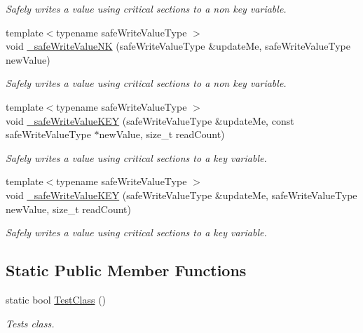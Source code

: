 \begin{DoxyCompactItemize}
\begin{DoxyCompactList}\small\item\em Safely writes a value using critical sections to a non key variable. \item\end{DoxyCompactList}\item 
{\footnotesize template$<$typename safeWriteValueType $>$ }\\void \hyperlink{class_concurrency_control_simple_af44214e11945a1e5cc44d5773c2d080a}{\_\-safeWriteValueNK} (safeWriteValueType \&updateMe, safeWriteValueType newValue)
\begin{DoxyCompactList}\small\item\em Safely writes a value using critical sections to a non key variable. \item\end{DoxyCompactList}\item 
{\footnotesize template$<$typename safeWriteValueType $>$ }\\void \hyperlink{class_concurrency_control_simple_a6b6ed3c59460ce6458c49b66412a6cbe}{\_\-safeWriteValueKEY} (safeWriteValueType \&updateMe, const safeWriteValueType $\ast$newValue, size\_\-t readCount)
\begin{DoxyCompactList}\small\item\em Safely writes a value using critical sections to a key variable. \item\end{DoxyCompactList}\item 
{\footnotesize template$<$typename safeWriteValueType $>$ }\\void \hyperlink{class_concurrency_control_simple_abd290165d11b7841ef88863b8d7b4fe1}{\_\-safeWriteValueKEY} (safeWriteValueType \&updateMe, safeWriteValueType newValue, size\_\-t readCount)
\begin{DoxyCompactList}\small\item\em Safely writes a value using critical sections to a key variable. \item\end{DoxyCompactList}\end{DoxyCompactItemize}
\subsection*{Static Public Member Functions}
\begin{DoxyCompactItemize}
\item 
static bool \hyperlink{class_concurrency_control_simple_a10aee9429b3c42640e3bb44d932a74c4}{TestClass} ()
\begin{DoxyCompactList}\small\item\em Tests class. \item\end{DoxyCompactList}\end{DoxyCompactItemize}
